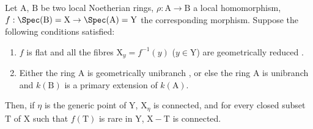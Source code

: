 \begin{theorem}[18.9.7]
\label{IV.18.9.7}
Let $\mathrm{A}$, $\mathrm{B}$ be two local Noetherian rings, $\rho:\mathrm{A}\to\mathrm{B}$ a local homomorphism, $f:\Spec(\mathrm{B})=\mathrm{X}\to\Spec(\mathrm{A})=\mathrm{Y}$ the corresponding morphism.
Suppose the following conditions satisfied:
\begin{enumerate}[label=\emph{\roman*)}]
  \item $f$ is flat and all the fibres $\mathrm{X}_y=f^{-1}(y)$ ($y\in\mathrm{Y}$) are geometrically reduced .
  \item Either the ring $\mathrm{A}$ is geometrically unibranch , or else the ring A is unibranch  and $k(\mathrm{B})$ is a primary extension  of $k(\mathrm{A})$.
\end{enumerate}
Then, if $\eta$ is the generic point of $\mathrm{Y}$, $\mathrm{X}_\eta$ is connected, and for every closed subset $\mathrm{T}$ of X such that $f(\mathrm{T})$ is rare in Y, $\mathrm{X}-\mathrm{T}$ is connected.
\end{theorem}

